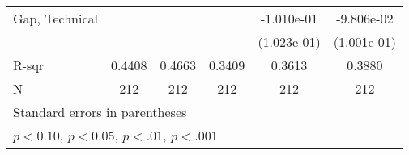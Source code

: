 {\begin{tabular}{l*{5}{c}}
    \addlinespace
    Gap, Technical            &                       &                       &                       & -1.010e-01            & -9.806e-02                  \\
                              &                       &                       &                       & (1.023e-01)           & (1.001e-01)                 \\
    \midrule
    R-sqr                     & 0.4408                & 0.4663                & 0.3409                & 0.3613                & 0.3880                      \\
    N                         & 212                   & 212                   & 212                   & 212                   & 212                         \\
    \bottomrule
    \multicolumn{6}{l}{\footnotesize Standard errors in parentheses}                                                                                        \\
    \multicolumn{6}{l}{\footnotesize \sym{+} \(p<0.10\), \sym{++} \(p<0.05\), \sym{*} \(p<.01\), \sym{**} \(p<.001\)}                                       \\
\end{tabular}
}
